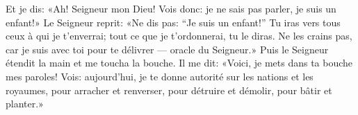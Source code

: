 Et je dis: «Ah! Seigneur mon Dieu! Vois donc:
	je ne sais pas parler, je suis un enfant!»
Le Seigneur reprit: «Ne dis pas: “Je suis un enfant!”
	Tu iras vers tous ceux à qui je t’enverrai;
	tout ce que je t’ordonnerai, tu le diras.
Ne les crains pas, car je suis avec toi pour te délivrer --- oracle du Seigneur.»
Puis le Seigneur étendit la main et me toucha la bouche.
Il me dit:
	«Voici, je mets dans ta bouche mes paroles!
	Vois: aujourd’hui, je te donne autorité sur les nations et les royaumes,
	pour arracher et renverser, pour détruire et démolir,
		pour bâtir et planter.»
